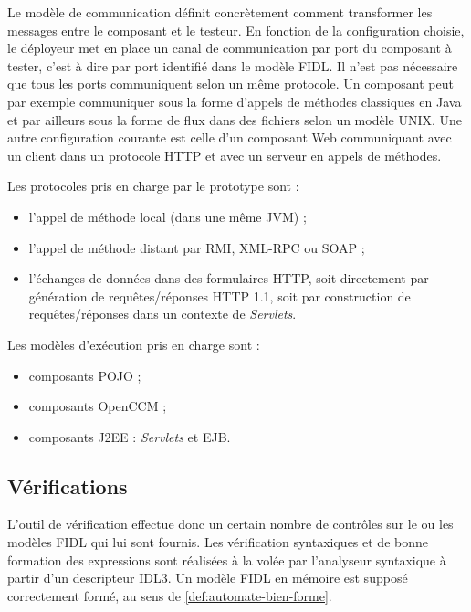 Le mod\`ele de communication d\'efinit concr\`etement comment
transformer les messages entre le composant et le testeur. En fonction
de la configuration choisie, le d\'eployeur met en place un canal de
communication par port du composant \`a tester, c'est \`a dire par
port identifi\'e dans le mod\`ele \textsf{FIDL}. Il n'est pas
n\'ecessaire que tous les ports communiquent selon un m\^eme
protocole. Un composant peut par exemple communiquer sous la forme
d'appels de m\'ethodes classiques en  \textsf{Java} et  par ailleurs
sous la forme de flux dans des fichiers selon un mod\`ele
\textsf{UNIX}. Une autre configuration courante est celle d'un
composant Web communiquant avec un client dans un protocole
\textsf{HTTP} et avec un serveur en appels de m\'ethodes. 

Les protocoles pris en charge par le prototype sont :
\begin{itemize}
  \item l'appel de m\'ethode local (dans une m\^eme \textsf{JVM}) ;
  \item l'appel de m\'ethode distant par \textsf{RMI},
    \textsf{XML-RPC} ou \textsf{SOAP} ;
  \item l'\'echanges de donn\'ees dans des formulaires \textsf{HTTP},
    soit directement par g\'en\'eration de requ\^etes/r\'eponses
    HTTP 1.1, soit par construction de requ\^etes/r\'eponses dans un
    contexte de \emph{Servlets}.
\end{itemize}

Les mod\`eles d'ex\'ecution pris en charge sont :
\begin{itemize}
  \item composants \textsf{POJO} ;
  \item composants \textsf{OpenCCM} ;
  \item composants \textsf{J2EE} : \emph{Servlets} et \textsf{EJB}.
\end{itemize}

\subsection{V\'erifications}

L'outil de v\'erification effectue donc un certain nombre de
contr\^oles sur le ou les mod\`eles FIDL qui lui sont fournis. Les
v\'erification syntaxiques et de bonne formation des expressions sont
r\'ealis\'ees \`a la vol\'ee par l'analyseur syntaxique \`a
partir d'un descripteur \textsf{IDL3}. Un mod\`ele \textsf{FIDL} en
m\'emoire est suppos\'e correctement form\'e, au sens de
\ref{def:automate-bien-forme}. 

